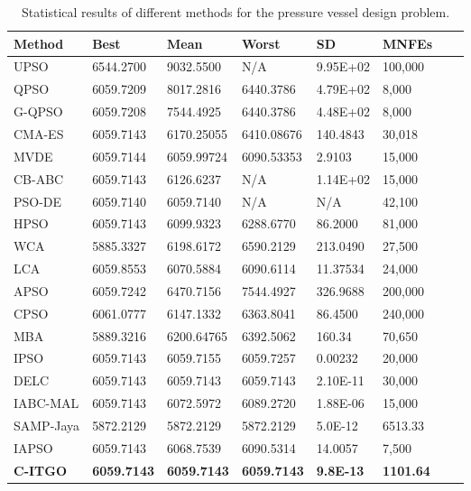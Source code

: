
\begin{table*}[tp]
    \tiny
    \begin{center}
    
    \begin{tabular}{ P{2.0cm} P{2.0cm} P{2.0cm} P{2.0cm} P{2.0cm} P{2.0cm} P{2.0cm} P{2.0cm}  }
    \hline
    \textbf{Method} & \textbf{Best} & \textbf{Mean} & \textbf{Worst} & \textbf{SD} & \textbf{MNFEs} \\
    \hline
    
    UPSO & 6544.2700 & 9032.5500 & N/A & 9.95E+02 & 100,000 \\
    QPSO & 6059.7209 & 8017.2816 & 6440.3786 & 4.79E+02 & 8,000 \\
    G-QPSO & 6059.7208 & 7544.4925 & 6440.3786 & 4.48E+02 & 8,000 \\
    CMA-ES & 6059.7143 & 6170.25055 & 6410.08676 & 140.4843 & 30,018 \\
    MVDE & 6059.7144 & 6059.99724 & 6090.53353 & 2.9103 & 15,000 \\ 
    CB-ABC & 6059.7143 & 6126.6237 & N/A & 1.14E+02 & 15,000 \\
    PSO-DE & 6059.7140 & 6059.7140 & N/A & N/A & 42,100 \\
    HPSO & 6059.7143 & 6099.9323 & 6288.6770 & 86.2000 & 81,000 \\
    WCA & 5885.3327 & 6198.6172 & 6590.2129 & 213.0490 & 27,500 \\
    LCA & 6059.8553 & 6070.5884 & 6090.6114 & 11.37534 & 24,000 \\
    APSO & 6059.7242 & 6470.7156 & 7544.4927 & 326.9688 & 200,000 \\
    CPSO & 6061.0777 & 6147.1332 & 6363.8041 & 86.4500 & 240,000 \\
    MBA & 5889.3216 & 6200.64765 & 6392.5062 & 160.34 & 70,650 \\    
    IPSO & 6059.7143 & 6059.7155 & 6059.7257 & 0.00232 & 20,000 \\
    DELC & 6059.7143 & 6059.7143 & 6059.7143 & 2.10E-11 & 30,000 \\  
    IABC-MAL & 6059.7143 & 6072.5972 & 6089.2720 & 1.88E-06 & 15,000 \\
    SAMP-Jaya & 5872.2129 & 5872.2129 & 5872.2129 & 5.0E-12 & 6513.33 \\    
    IAPSO & 6059.7143 & 6068.7539 & 6090.5314 & 14.0057 & 7,500 \\
    \textbf{C-ITGO} & \bf{6059.7143} & \bf{6059.7143} & \bf{6059.7143} & \bf{9.8E-13} & \bf{1101.64} \\
    
    \hline
    \end{tabular}
    \end{center}
    \vspace*{-6mm}
    \caption{Statistical results of different methods for the pressure vessel design problem. \\[1em]}
    \label{tab:PV}
    \end{table*}
    
    